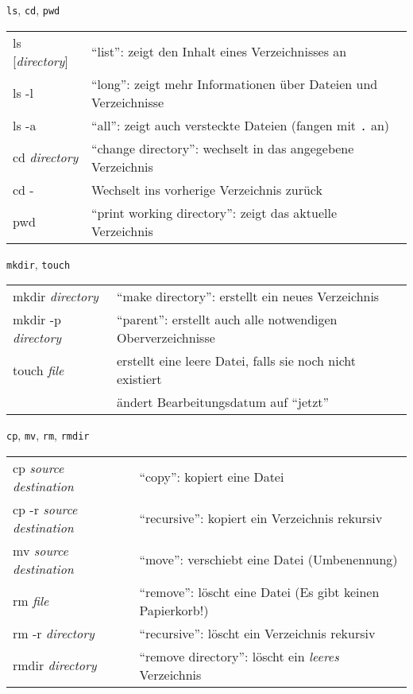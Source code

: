 \begin{frame}{\texttt{ls}, \texttt{cd}, \texttt{pwd}}
  \begin{tabu}{>{\ttfamily}l X[,L]}
    ls [\textit{directory}] & \enquote{list}: zeigt den Inhalt eines Verzeichnisses an \\
    ls -l                   & \enquote{long}: zeigt mehr Informationen über Dateien und Verzeichnisse \\
    ls -a                   & \enquote{all}: zeigt auch versteckte Dateien (fangen mit \texttt{.} an) \\
    cd \textit{directory} & \enquote{change directory}: wechselt in das angegebene Verzeichnis\\
    cd - & Wechselt ins vorherige Verzeichnis zurück \\
    pwd                   & \enquote{print working directory}: zeigt das aktuelle Verzeichnis \\
  \end{tabu}
\end{frame}

\begin{frame}{\texttt{mkdir}, \texttt{touch}}
  \begin{tabu}{>{\ttfamily}l X[,L]}
    mkdir \textit{directory}    & \enquote{make directory}: erstellt ein neues Verzeichnis \\
    mkdir -p \textit{directory} & \enquote{parent}: erstellt auch alle notwendigen Oberverzeichnisse \\
    touch \textit{file}         & erstellt eine leere Datei, falls sie noch nicht existiert \\
                                & ändert Bearbeitungsdatum auf \enquote{jetzt}
  \end{tabu}
\end{frame}

\begin{frame}{\texttt{cp}, \texttt{mv}, \texttt{rm}, \texttt{rmdir}}
  \begin{tabu}{>{\ttfamily}l X[,L]}
    cp \textit{source} \textit{destination}    & \enquote{copy}: kopiert eine Datei \\
    cp -r \textit{source} \textit{destination} & \enquote{recursive}: kopiert ein Verzeichnis rekursiv \\
    mv \textit{source} \textit{destination}     & \enquote{move}: verschiebt eine Datei (Umbenennung) \\
    rm \textit{file}                           & \enquote{remove}: löscht eine Datei (Es gibt keinen Papierkorb!) \\
    rm -r \textit{directory}                   & \enquote{recursive}: löscht ein Verzeichnis rekursiv \\
    rmdir \textit{directory}                   & \enquote{remove directory}: löscht ein \emph{leeres} Verzeichnis
  \end{tabu}
\end{frame}


